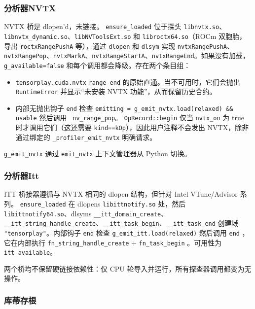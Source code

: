 \subsubsection{分析器NVTX}

NVTX 桥是 dlopen'd，未链接。 \texttt{ensure\_loaded} 位于探头 \texttt{libnvtx.so}、\texttt{libnvtx\_dynamic.so}、\texttt{libNVToolsExt.so} 和 \texttt{libroctx64.so}（ROCm 双胞胎，导出 \texttt{roctxRangePushA} 等），通过 \texttt{dlopen} 和 \texttt{dlsym} 实现 \texttt{nvtxRangePushA}、\texttt{nvtxRangePop}、\texttt{nvtxMarkA}、\texttt{nvtxRangeStartA}、\texttt{nvtxRangeEnd}。如果没有加载，\texttt{g\_available=false} 和每个调用都会降级。存在两个条目组：

\begin{itemize}[leftmargin=1.4em]
\item \texttt{tensorplay.cuda.nvtx} \texttt{range\_end} 的原始直通。当不可用时，它们会抛出 \texttt{RuntimeError} 并显示“未安装 NVTX 功能”，从而保留历史合约。
\item 内部无抛出钩子 \texttt{end} 检查 \texttt{emitting = g\_emit\_nvtx.load(relaxed) \&\& usable} 然后调用 \texttt{ nv\_range\_pop}。 \texttt{OpRecord::begin} 仅当 \texttt{nvtx\_on} 为 true 时才调用它们（这还需要 \texttt{kind==kOp}），因此用户注释不会发出 NVTX，除非通过绑定的 \texttt{\_profiler\_emit\_nvtx} 明确请求。
\end{itemize}

\texttt{g\_emit\_nvtx} 通过 \texttt{emit\_nvtx} 上下文管理器从 Python 切换。

\subsubsection{分析器Itt}

ITT 桥接器遵循与 NVTX 相同的 dlopen 结构，但针对 Intel VTune/Advisor 系列。 \texttt{ensure\_loaded} 在 dlopens \texttt{libittnotify.so} 处，然后 \texttt{libittnotify64.so}、dlsyms \texttt{\_\_itt\_domain\_create}、\texttt{\_\_itt\_string\_handle\_create}、\texttt{\_\_itt\_task\_begin}、\texttt{\_\_itt\_task\_end} 创建域 \texttt{"tensorplay"}。内部钩子 \texttt{end} 检查 \texttt{g\_emit\_itt.load(relaxed)} 然后调用 \texttt{end} ，它在内部执行 \texttt{fn\_string\_handle\_create} + \texttt{fn\_task\_begin} 。可用性为 \texttt{itt\_available}。

两个桥均不保留硬链接依赖性：仅 CPU 轮导入并运行，所有探查器调用都变为无操作。

\subsubsection{库蒂存根}

